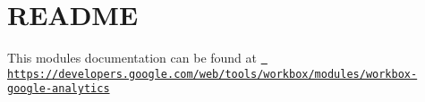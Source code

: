 \chapter{README}
\hypertarget{md_pkiclassroomrescheduler_2src_2main_2frontend_2node__modules_2workbox-google-analytics_2_r_e_a_d_m_e}{}\label{md_pkiclassroomrescheduler_2src_2main_2frontend_2node__modules_2workbox-google-analytics_2_r_e_a_d_m_e}
This module\textquotesingle{}s documentation can be found at \href{https://developers.google.com/web/tools/workbox/modules/workbox-google-analytics}{\texttt{ https\+://developers.\+google.\+com/web/tools/workbox/modules/workbox-\/google-\/analytics}} 